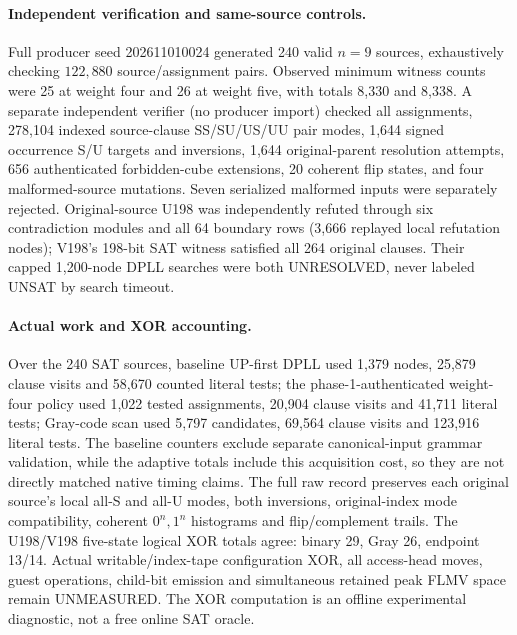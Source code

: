 \documentclass[11pt]{article}
\begin{document}
\paragraph{Independent verification and same-source controls.}
Full producer seed 202611010024 generated 240 valid $n=9$ sources, exhaustively checking $122{,}880$ source/assignment pairs. Observed minimum witness counts were 25 at weight four and 26 at weight five, with totals 8,330 and 8,338. A separate independent verifier (no producer import) checked all assignments, 278,104 indexed source-clause SS/SU/US/UU pair modes, 1,644 signed occurrence S/U targets and inversions, 1,644 original-parent resolution attempts, 656 authenticated forbidden-cube extensions, 20 coherent flip states, and four malformed-source mutations. Seven serialized malformed inputs were separately rejected. Original-source U198 was independently refuted through six contradiction modules and all 64 boundary rows (3,666 replayed local refutation nodes); V198's 198-bit SAT witness satisfied all 264 original clauses. Their capped 1,200-node DPLL searches were both UNRESOLVED, never labeled UNSAT by search timeout.

\paragraph{Actual work and XOR accounting.}
Over the 240 SAT sources, baseline UP-first DPLL used 1,379 nodes, 25,879 clause visits and 58,670 counted literal tests; the phase-1-authenticated weight-four policy used 1,022 tested assignments, 20,904 clause visits and 41,711 literal tests; Gray-code scan used 5,797 candidates, 69,564 clause visits and 123,916 literal tests. The baseline counters exclude separate canonical-input grammar validation, while the adaptive totals include this acquisition cost, so they are not directly matched native timing claims. The full raw record preserves each original source's local all-S and all-U modes, both inversions, original-index mode compatibility, coherent $0^n,1^n$ histograms and flip/complement trails. The U198/V198 five-state logical XOR totals agree: binary 29, Gray 26, endpoint 13/14. Actual writable/index-tape configuration XOR, all access-head moves, guest operations, child-bit emission and simultaneous retained peak FLMV space remain UNMEASURED. The XOR computation is an offline experimental diagnostic, not a free online SAT oracle.
\end{document}
